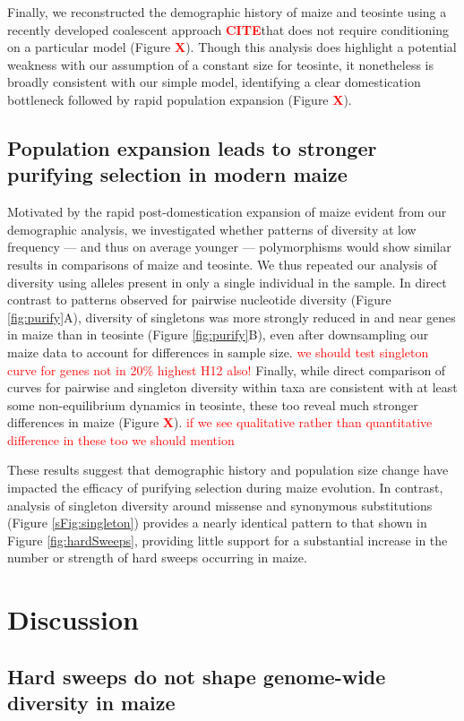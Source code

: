 \documentclass{pnastwo}
\newcommand{\jri}[1]{\textcolor{red}{\scriptsize #1}}
\newcommand{\citex}{\textcolor{red}{\bf CITE}}
\newcommand{\X}{\textcolor{red}{\bf X}}
\begin{document}
\begin{article}
Finally, we reconstructed the demographic history of maize and teosinte using a recently developed coalescent approach \citex that does not require conditioning on a particular model (Figure \X).
Though this analysis does highlight a potential weakness with our assumption of a constant size for teosinte, it nonetheless is broadly consistent with our simple model,   identifying a clear domestication bottleneck followed by rapid population expansion (Figure \X). 

\subsection{Population expansion leads to stronger purifying selection in modern maize}
Motivated by the rapid post-domestication expansion of maize evident from our demographic analysis, we investigated whether patterns of diversity at low frequency --- and thus on average younger --- polymorphisms would show similar results in comparisons of maize and teosinte.
We thus repeated our analysis of diversity using alleles present in only a single individual in the sample.
In direct contrast to patterns observed for pairwise nucleotide diversity (Figure \ref{fig:purify}A), diversity of singletons was more strongly reduced in and near genes in maize than in teosinte (Figure \ref{fig:purify}B), even after downsampling our maize data to account for differences in sample size. \jri{we should test singleton curve for genes not in 20\% highest H12 also!}   
Finally, while direct comparison of curves for pairwise and singleton diversity within taxa are consistent with at least some non-equilibrium dynamics in teosinte, these too reveal much stronger differences in maize (Figure \X). \jri{if we see qualitative rather than quantitative difference in these too we should mention}

These results suggest that demographic history and population size change have impacted the efficacy of purifying selection during maize evolution.
In contrast, analysis of singleton diversity around missense and synonymous substitutions (Figure \ref{sFig:singleton}) provides a nearly identical pattern to that shown in Figure \ref{fig:hardSweeps}, providing little support for a substantial increase in the number or strength of hard sweeps occurring in maize.  

\section{Discussion}
\subsection{Hard sweeps do not shape genome-wide diversity in maize}


\end{article}
\end{document}
